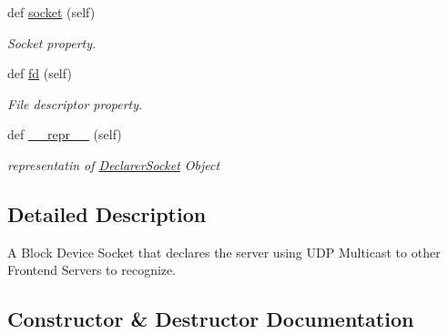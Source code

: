 \begin{DoxyCompactItemize}
def \hyperlink{class_r_a_i_d5_1_1block__device_1_1pollables_1_1declarer__socket_1_1_declarer_socket_ae5cf6477968fe119eed756e117ed2db2}{socket} (self)
\begin{DoxyCompactList}\small\item\em Socket property. \end{DoxyCompactList}\item 
\mbox{\label{class_r_a_i_d5_1_1block__device_1_1pollables_1_1declarer__socket_1_1_declarer_socket_a389a320c5f7132d02c6be9b268bc247f}} 
def \hyperlink{class_r_a_i_d5_1_1block__device_1_1pollables_1_1declarer__socket_1_1_declarer_socket_a389a320c5f7132d02c6be9b268bc247f}{fd} (self)
\begin{DoxyCompactList}\small\item\em File descriptor property. \end{DoxyCompactList}\item 
def \hyperlink{class_r_a_i_d5_1_1block__device_1_1pollables_1_1declarer__socket_1_1_declarer_socket_a86b05b1856efb3051b78b6562934ac24}{\+\_\+\+\_\+repr\+\_\+\+\_\+} (self)
\begin{DoxyCompactList}\small\item\em representatin of \hyperlink{class_r_a_i_d5_1_1block__device_1_1pollables_1_1declarer__socket_1_1_declarer_socket}{Declarer\+Socket} Object \end{DoxyCompactList}\end{DoxyCompactItemize}


\subsection{Detailed Description}
A Block Device Socket that declares the server using U\+DP Multicast to other Frontend Servers to recognize. 

\subsection{Constructor \& Destructor Documentation}
\mbox{\label{class_r_a_i_d5_1_1block__device_1_1pollables_1_1declarer__socket_1_1_declarer_socket_a0da7f9ba5573de93db76bd439e2aea6a}} 
